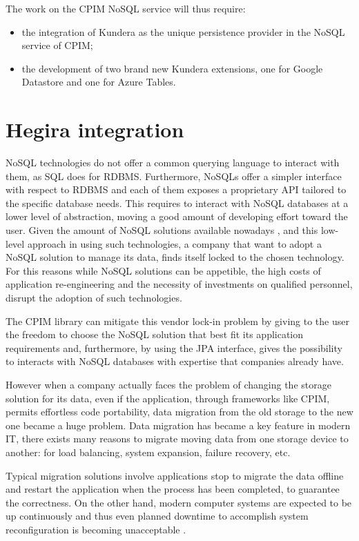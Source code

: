 \newparagraph The work on the CPIM NoSQL service will thus require:
\begin{itemize}
\item the integration of Kundera as the unique persistence provider in the NoSQL service of CPIM;
\item the development of two brand new Kundera extensions, one for Google Datastore and one for Azure Tables.
\end{itemize}

\section{Hegira integration}
NoSQL technologies do not offer a common querying language to interact with them, as SQL does for RDBMS. Furthermore, NoSQLs offer a simpler interface with respect to RDBMS and each of them exposes a proprietary API tailored to the specific database needs. This requires to interact with NoSQL databases at a lower level of abstraction, moving a good amount of developing effort toward the user.
Given the amount of NoSQL solutions available nowadays \cite{online:nosql-database.org}, and this low-level approach in using such technologies, a company that want to adopt a NoSQL solution to manage its data, finds itself locked to the chosen technology. 
For this reasons while NoSQL solutions can be appetible, the high costs of application re-engineering and the necessity of investments on qualified personnel, disrupt the adoption of such technologies.

\noindent The CPIM library can mitigate this vendor lock-in problem by giving to the user the freedom to choose the NoSQL solution that best fit its application requirements and, furthermore, by using the JPA interface, gives the possibility to interacts with NoSQL databases with expertise that companies already have.

\newparagraph However when a company actually faces the problem of changing the storage solution for its data, even if the application, through frameworks like CPIM, permits effortless code portability, data migration from the old storage to the new one became a huge problem. 
Data migration has became a key feature in modern IT, there exists many reasons to migrate moving data from one storage device to
another: for load balancing, system expansion, failure recovery, etc.

\noindent Typical migration solutions involve applications stop to migrate the data offline and restart the application when the process has been completed, to guarantee the correctness. On the other hand, modern computer systems are expected to be up continuously and thus even planned downtime to accomplish system reconfiguration is becoming unacceptable \cite{paper:hitachi}.

